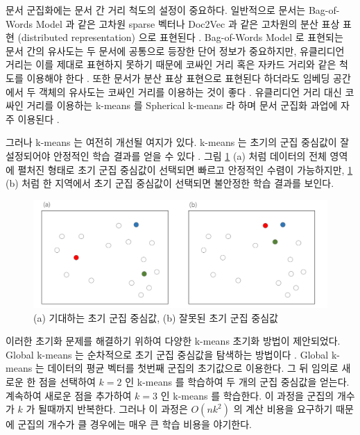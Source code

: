 \documentclass[oneside, ko,phd]{snuthesis_utf8_kor}
\begin{document}
문서 군집화에는 문서 간 거리 척도의 설정이 중요하다.
일반적으로 문서는 Bag-of-Words Model 과 같은 고차원 sparse 벡터나 Doc2Vec 과 같은 고차원의 분산 표상 표현 (distributed representation) 으로 표현된다 \cite{le2014distributed, dai2015document}.
Bag-of-Words Model 로 표현되는 문서 간의 유사도는 두 문서에 공통으로 등장한 단어 정보가 중요하지만, 유클리디언 거리는 이를 제대로 표현하지 못하기 때문에 코싸인 거리 혹은 자카드 거리와 같은 척도를 이용해야 한다 \cite{huang2008similarity}.
또한 문서가 분산 표상 표현으로 표현된다 하더라도 임베딩 공간에서 두 객체의 유사도는 코싸인 거리를 이용하는 것이 좋다 \cite{levy2015improving}.
유클리디언 거리 대신 코싸인 거리를 이용하는 k-means 를 Spherical k-means 라 하며 문서 군집화 과업에 자주 이용된다 \cite{dhillon2002iterative, buchta2012spherical}.

그러나 k-means 는 여전히 개선될 여지가 있다.
k-means 는 초기의 군집 중심값이 잘 설정되어야 안정적인 학습 결과를 얻을 수 있다 \cite{arthur2007k}.
그림 \ref{fig:initialization_good_bad} (a) 처럼 데이터의 전체 영역에 펼처진 형태로 초기 군집 중심값이 선택되면 빠르고 안정적인 수렴이 가능하지만, \ref{fig:initialization_good_bad} (b) 처럼 한 지역에서 초기 군집 중심값이 선택되면 불안정한 학습 결과를 보인다.

\begin{figure}[H]
\centering
\includegraphics[keepaspectratio=true, width=0.95\linewidth]{fig/kmeans_initialization_good_bad.png}
\caption{(a) 기대하는 초기 군집 중심값, (b) 잘못된 초기 군집 중심값}
\label{fig:initialization_good_bad}
\end{figure}

이러한 초기화 문제를 해결하기 위하여 다양한 k-means 초기화 방법이 제안되었다.
Global k-means 는 순차적으로 초기 군집 중심값을 탐색하는 방법이다 \cite{likas2003global, bagirov2008modified}.
Global k-means 는 데이터의 평균 벡터를 첫번째 군집의 초기값으로 이용한다.
그 뒤 임의로 새로운 한 점을 선택하여 $k=2$ 인 k-means 를 학습하여 두 개의 군집 중심값을 얻는다.
계속하여 새로운 점을 추가하여 $k=3$ 인 k-means 를 학습한다.
이 과정을 군집의 개수가 $k$ 가 될때까지 반복한다.
그러나 이 과정은 $O(nk^2)$ 의 계산 비용을 요구하기 때문에 군집의 개수가 클 경우에는 매우 큰 학습 비용을 야기한다.
\end{document}
